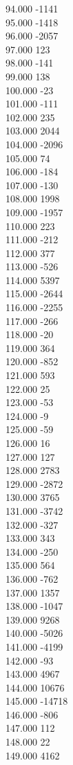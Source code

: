 { 94.000	-1141 \\
 95.000	-1418 \\
 96.000	-2057 \\
 97.000	123 \\
 98.000	-141 \\
 99.000	138 \\
 100.000	-23 \\
 101.000	-111 \\
 102.000	235 \\
 103.000	2044 \\
 104.000	-2096 \\
 105.000	74 \\
 106.000	-184 \\
 107.000	-130 \\
 108.000	1998 \\
 109.000	-1957 \\
 110.000	223 \\
 111.000	-212 \\
 112.000	377 \\
 113.000	-526 \\
 114.000	5397 \\
 115.000	-2644 \\
 116.000	-2255 \\
 117.000	-266 \\
 118.000	-20 \\
 119.000	364 \\
 120.000	-852 \\
 121.000	593 \\
 122.000	25 \\
 123.000	-53 \\
 124.000	-9 \\
 125.000	-59 \\
 126.000	16 \\
 127.000	127 \\
 128.000	2783 \\
 129.000	-2872 \\
 130.000	3765 \\
 131.000	-3742 \\
 132.000	-327 \\
 133.000	343 \\
 134.000	-250 \\
 135.000	564 \\
 136.000	-762 \\
 137.000	1357 \\
 138.000	-1047 \\
 139.000	9268 \\
 140.000	-5026 \\
 141.000	-4199 \\
 142.000	-93 \\
 143.000	4967 \\
 144.000	10676 \\
 145.000	-14718 \\
 146.000	-806 \\
 147.000	112 \\
 148.000	22 \\
 149.000	4162 \\
}

